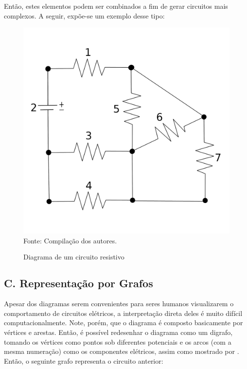 \documentclass[twocolumn, 10pt]{extarticle}
\begin{document}
Então, estes elementos podem ser combinados a fim de gerar circuitos mais complexos. A seguir, expõe-se um exemplo desse tipo:

\begin{figure}[H]
	\caption{Diagrama de um circuito resistivo} 
	\centering
	\includegraphics[scale=0.35]{circ1}
	\\ Fonte: Compilação dos autores.
\end{figure}


\subsection*{C. \quad Representação por Grafos}

Apesar dos diagramas serem convenientes para seres humanos visualizarem o comportamento de circuitos elétricos, a interpretação direta deles é muito difícil computacionalmente. Note, porém, que o diagrama é composto basicamente por vértices e arestas. Então, é possível redesenhar o diagrama como um digrafo, tomando os vértices como pontos sob diferentes potenciais e os arcos (com a mesma numeração) como os componentes elétricos, assim como mostrado por \cite[p. 838]{krishna}. Então, o seguinte grafo representa o circuito anterior:
\end{document}
